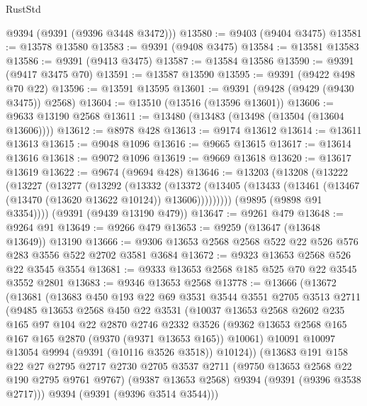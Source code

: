 \begin{lexlean}{RustStd}
\begin{coremodule}
      @9394
      (@9391 (@9396 @3448 @3472)))
@13580 := @9403 (@9404 @3475)
@13581 := @13578 @13580
@13583 := @9391 (@9408 @3475)
@13584 := @13581 @13583
@13586 := @9391 (@9413 @3475)
@13587 := @13584 @13586
@13590 := @9391 (@9417 @3475 @70)
@13591 := @13587 @13590
@13595 := @9391 (@9422 @498 @70 @22)
@13596 := @13591 @13595
@13601 := @9391 (@9428 (@9429 (@9430 @3475)) @2568)
@13604 := @13510 (@13516 (@13596 @13601))
@13606 := @9633 @13190 @2568
@13611 := @13480 (@13483 (@13498 (@13504 (@13604 @13606))))
@13612 := @8978 @428
@13613 := @9174 @13612
@13614 := @13611 @13613
@13615 := @9048 @1096
@13616 := @9665 @13615
@13617 := @13614 @13616
@13618 := @9072 @1096
@13619 := @9669 @13618
@13620 := @13617 @13619
@13622 := @9674 (@9694 @428)
@13646 := @13203
    (@13208
      (@13222
        (@13227
          (@13277
            (@13292
              (@13332
                (@13372
                  (@13405 (@13433 (@13461 (@13467 (@13470 (@13620 @13622 @10124)) @13606)))))))))
        (@9895 (@9898 @91 @3354))))
    (@9391 (@9439 @13190 @479))
@13647 := @9261 @479
@13648 := @9264 @91
@13649 := @9266 @479
@13653 := @9259 (@13647 (@13648 @13649)) @13190
@13666 := @9306 @13653 @2568 @2568 @522 @22 @526 @576 @283 @3556 @522 @2702 @3581 @3684
@13672 := @9323 @13653 @2568 @526 @22 @3545 @3554
@13681 := @9333 @13653 @2568 @185 @525 @70 @22 @3545 @3552 @2801
@13683 := @9346 @13653 @2568
@13778 := @13666
    (@13672
      (@13681
        (@13683
          @450
          @193
          @22
          @69
          @3531
          @3544
          @3551
          @2705
          @3513
          @2711
          (@9485
            @13653
            @2568
            @450
            @22
            @3531
            (@10037
              @13653
              @2568
              @2602
              @235
              @165
              @97
              @104
              @22
              @2870
              @2746
              @2332
              @3526
              (@9362 @13653 @2568 @165 @167 @165 @2870 (@9370 (@9371 @13653 @165)) @10061)
              @10091
              @10097
              @13054
              @9994
              (@9391 (@10116 @3526 @3518))
              @10124))
          (@13683
            @191
            @158
            @22
            @27
            @2795
            @2717
            @2730
            @2705
            @3537
            @2711
            (@9750 @13653 @2568 @22 @190 @2795 @9761 @9767)
            (@9387 @13653 @2568)
            @9394
            (@9391 (@9396 @3538 @2717)))
          @9394
          (@9391 (@9396 @3514 @3544)))

\end{coremodule}
\end{lexlean}
